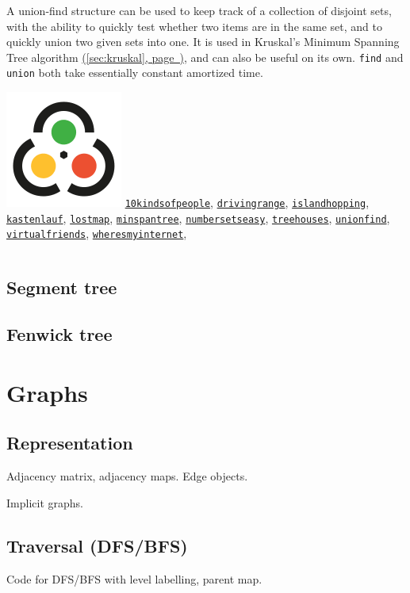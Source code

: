 \documentclass[10pt]{article}
\newcommand{\code}[1]{\inputminted[fontsize=\normalsize]{java}{code/#1}}
\newcommand*{\link}[1]{\hyperref[{#1}]{(\ref*{#1}, page~\pageref*{#1})}}
\newcommand{\kattis}[1]{\href{https://open.kattis.com/problems/#1}{\texttt{#1}}}
\begin{document}
A union-find structure can be used to keep track of a collection of
disjoint sets, with the ability to quickly test whether two items are
in the same set, and to quickly union two given sets into one.  It is
used in Kruskal's Minimum Spanning Tree algorithm \link{sec:kruskal},
and can also be useful on its own.  \texttt{find} and \texttt{union}
both take essentially constant amortized time.

\includegraphics[height=0.9\baselineskip]{Kattis} \kattis{10kindsofpeople}, \kattis{drivingrange},
\kattis{islandhopping}, \kattis{kastenlauf}, \kattis{lostmap},
\kattis{minspantree}, \kattis{numbersetseasy}, \kattis{treehouses},
\kattis{unionfind}, \kattis{virtualfriends},
\kattis{wheresmyinternet},

\code{data-structures/UnionFind.java}

\subsection{Segment tree}

\subsection{Fenwick tree}


\section{Graphs}

\subsection{Representation}

  Adjacency matrix, adjacency maps.  Edge objects.

  Implicit graphs.

\subsection{Traversal (DFS/BFS)}

Code for DFS/BFS with level labelling, parent map.
\end{document}
